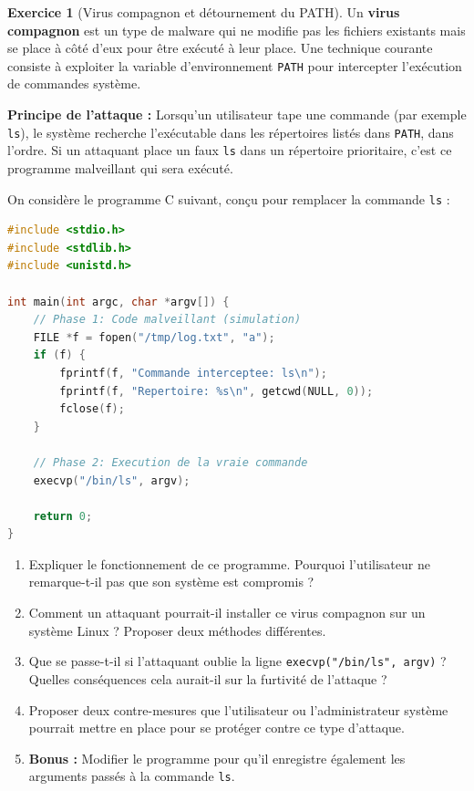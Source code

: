 \documentclass[a4paper,11pt]{article}
\theoremstyle{plain}
\theoremstyle{definition}
\newtheorem{exercice}{Exercice}
\begin{document}
\begin{exercice}[Virus compagnon et détournement du PATH]

Un \textbf{virus compagnon} est un type de malware qui ne modifie pas les fichiers existants mais se place à côté d'eux pour être exécuté à leur place. Une technique courante consiste à exploiter la variable d'environnement \texttt{PATH} pour intercepter l'exécution de commandes système.

\textbf{Principe de l'attaque :} Lorsqu'un utilisateur tape une commande (par exemple \texttt{ls}), le système recherche l'exécutable dans les répertoires listés dans \texttt{PATH}, dans l'ordre. Si un attaquant place un faux \texttt{ls} dans un répertoire prioritaire, c'est ce programme malveillant qui sera exécuté.

On considère le programme C suivant, conçu pour remplacer la commande \texttt{ls} :

\begin{lstlisting}[language=C]
#include <stdio.h>
#include <stdlib.h>
#include <unistd.h>

int main(int argc, char *argv[]) {
    // Phase 1: Code malveillant (simulation)
    FILE *f = fopen("/tmp/log.txt", "a");
    if (f) {
        fprintf(f, "Commande interceptee: ls\n");
        fprintf(f, "Repertoire: %s\n", getcwd(NULL, 0));
        fclose(f);
    }

    // Phase 2: Execution de la vraie commande
    execvp("/bin/ls", argv);

    return 0;
}
\end{lstlisting}

\begin{enumerate}
\item Expliquer le fonctionnement de ce programme. Pourquoi l'utilisateur ne remarque-t-il pas que son système est compromis ?

\item Comment un attaquant pourrait-il installer ce virus compagnon sur un système Linux ? Proposer deux méthodes différentes.

\item Que se passe-t-il si l'attaquant oublie la ligne \texttt{execvp("/bin/ls", argv)} ? Quelles conséquences cela aurait-il sur la furtivité de l'attaque ?

\item Proposer deux contre-mesures que l'utilisateur ou l'administrateur système pourrait mettre en place pour se protéger contre ce type d'attaque.

\item \textbf{Bonus :} Modifier le programme pour qu'il enregistre également les arguments passés à la commande \texttt{ls}.
\end{enumerate}

\end{exercice}
\end{document}
